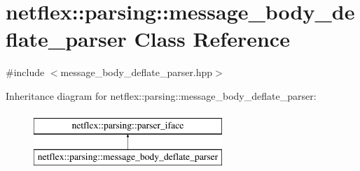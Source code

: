 \hypertarget{classnetflex_1_1parsing_1_1message__body__deflate__parser}{}\section{netflex\+:\+:parsing\+:\+:message\+\_\+body\+\_\+deflate\+\_\+parser Class Reference}
\label{classnetflex_1_1parsing_1_1message__body__deflate__parser}


{\ttfamily \#include $<$message\+\_\+body\+\_\+deflate\+\_\+parser.\+hpp$>$}

Inheritance diagram for netflex\+:\+:parsing\+:\+:message\+\_\+body\+\_\+deflate\+\_\+parser\+:\begin{figure}[H]
\begin{center}
\leavevmode
\includegraphics[height=2.000000cm]{classnetflex_1_1parsing_1_1message__body__deflate__parser}
\end{center}
\end{figure}
